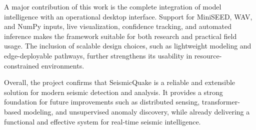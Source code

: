 \documentclass[a4paper,12pt]{report}
\begin{document}
A major contribution of this work is the complete integration of model intelligence with an operational desktop interface. Support for MiniSEED, WAV, and NumPy inputs, live visualization, confidence tracking, and automated inference makes the framework suitable for both research and practical field usage. The inclusion of scalable design choices, such as lightweight modeling and edge-deployable pathways, further strengthens its usability in resource-constrained environments.

Overall, the project confirms that SeismicQuake is a reliable and extensible solution for modern seismic detection and analysis. It provides a strong foundation for future improvements such as distributed sensing, transformer-based modeling, and unsupervised anomaly discovery, while already delivering a functional and effective system for real-time seismic intelligence.

\newpage


\renewcommand{\bibname}{REFERENCES}


\end{document}
